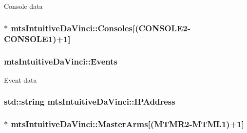 Console data \hypertarget{classmts_intuitive_da_vinci_a54227f36bb8c45e2eac7c3e4eaf1d8ad}{
\subsubsection[{Consoles}]{$\ast$ mts\-Intuitive\-Da\-Vinci\-::\-Consoles\mbox{[}({\bf C\-O\-N\-S\-O\-L\-E2}-\/{\bf C\-O\-N\-S\-O\-L\-E1})+1\mbox{]}\hspace{0.3cm}{\ttfamily [protected]}}}\label{classmts_intuitive_da_vinci_a54227f36bb8c45e2eac7c3e4eaf1d8ad}
\hypertarget{classmts_intuitive_da_vinci_adbe39e510898b80b04aac001722dc6fd}{
\subsubsection[{Events}]{ mts\-Intuitive\-Da\-Vinci\-::\-Events\hspace{0.3cm}{\ttfamily [protected]}}}\label{classmts_intuitive_da_vinci_adbe39e510898b80b04aac001722dc6fd}
Event data \hypertarget{classmts_intuitive_da_vinci_aa5fb5d66628f24155b54300b3b3ed2b2}{
\subsubsection[{I\-P\-Address}]{\setlength{\rightskip}{0pt plus 5cm}std\-::string mts\-Intuitive\-Da\-Vinci\-::\-I\-P\-Address\hspace{0.3cm}{\ttfamily [protected]}}}\label{classmts_intuitive_da_vinci_aa5fb5d66628f24155b54300b3b3ed2b2}
\hypertarget{classmts_intuitive_da_vinci_aca2410ba38bf0ad7fce1481f8701c1da}{
\subsubsection[{Master\-Arms}]{$\ast$ mts\-Intuitive\-Da\-Vinci\-::\-Master\-Arms\mbox{[}({\bf M\-T\-M\-R2}-\/{\bf M\-T\-M\-L1})+1\mbox{]}\hspace{0.3cm}{\ttfamily [protected]}}}\label{classmts_intuitive_da_vinci_aca2410ba38bf0ad7fce1481f8701c1da}
